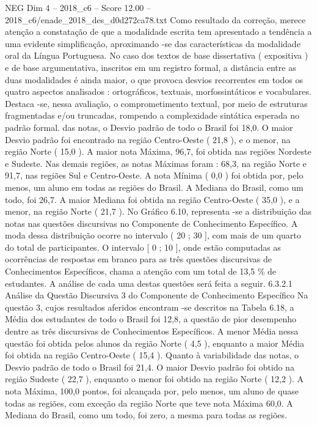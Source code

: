 \begin{textsample}{NEG Dim 4 – 2018\_c6 – Score 12.00 – 2018\_c6/enade\_2018\_des\_d0d272ca78.txt}
Como resultado da correção, merece atenção a constatação de que a modalidade escrita tem apresentado a tendência a uma evidente simplificação, aproximando -se das características da modalidade oral da Língua Portuguesa.
No caso dos textos de base dissertativa ( expositiva ) e de base argumentativa, inscritos em um registro formal, a distância entre as duas modalidades é ainda maior, o que provoca desvios recorrentes em todos os quatro aspectos analisados : ortográficos, textuais, morfossintáticos e vocabulares.
Destaca -se, nessa avaliação, o comprometimento textual, por meio de estruturas fragmentadas e/ou truncadas, rompendo a complexidade sintática esperada no padrão formal. das notas, o Desvio padrão de todo o Brasil foi 18,0.
O maior Desvio padrão foi encontrado na região Centro-Oeste ( 21,8 ), e o menor, na região Norte ( 15,0 ).
A maior nota Máxima, 96,7, foi obtida nas regiões Nordeste e Sudeste.
Nas demais regiões, as notas Máximas foram : 68,3, na região Norte e 91,7, nas regiões Sul e Centro-Oeste.
A nota Mínima ( 0,0 ) foi obtida por, pelo menos, um aluno em todas as regiões do Brasil.
A Mediana do Brasil, como um todo, foi 26,7.
A maior Mediana foi obtida na região Centro-Oeste ( 35,0 ), e a menor, na região Norte ( 21,7 ).
No Gráfico 6.10, representa -se a distribuição das notas nas questões discursivas no Componente de Conhecimento Específico.
A moda dessa distribuição ocorre no intervalo ( 20 ; 30 ], com mais de um quarto do total de participantes.
O intervalo [ 0 ; 10 ], onde estão computadas as ocorrências de respostas em branco para as três questões discursivas de Conhecimentos Específicos, chama a atenção com um total de 13,5 \% de estudantes.
A análise de cada uma destas questões será feita a seguir. 6.3.2.1 Análise da Questão Discursiva 3 do Componente de Conhecimento Específico Na questão 3, cujos resultados aferidos encontram -se descritos na Tabela 6.18, a Média dos estudantes de todo o Brasil foi 12,8, a questão de pior desempenho dentre as três discursivas de Conhecimentos Específicos.
A menor Média nessa questão foi obtida pelos alunos da região Norte ( 4,5 ), enquanto a maior Média foi obtida na região Centro-Oeste ( 15,4 ).
Quanto à variabilidade das notas, o Desvio padrão de todo o Brasil foi 21,4.
O maior Desvio padrão foi obtido na região Sudeste ( 22,7 ), enquanto o menor foi obtido na região Norte ( 12,2 ).
A nota Máxima, 100,0 pontos, foi alcançada por, pelo menos, um aluno de quase todas as regiões, com exceção da região Norte que teve nota Máxima 60,0.
A Mediana do Brasil, como um todo, foi zero, a mesma para todas as regiões.

\end{textsample}
